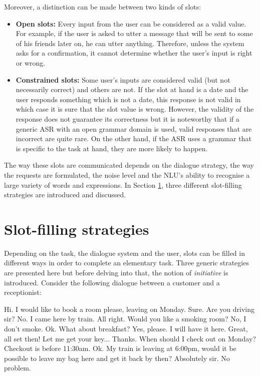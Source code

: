 	Moreover, a distinction can be made between two kinds of slots:
	
	\begin{itemize}
		\item \textbf{Open slots:} Every input from the user can be considered as a valid value. For example, if the user is asked to utter a message that will be sent to some of his friends later on, he can utter anything. Therefore, unless the system asks for a confirmation, it cannot determine whether the user's input is right or wrong.
		\item \textbf{Constrained slots:} Some user's inputs are considered valid (but not necessarily correct) and others are not. If the slot at hand is a date and the user responds something which is not a date, this response is not valid in which case it is sure that the slot value is wrong. However, the validity of the response does not guarantee its correctness but it is noteworthy that if a generic ASR with an open grammar domain is used, valid responses that are incorrect are quite rare. On the other hand, if the ASR uses a grammar that is specific to the task at hand, they are more likely to happen.
	\end{itemize}
	
	The way these slots are communicated depends on the dialogue strategy, the way the requests are formulated, the noise level and the NLU's ability to recognise a large variety of words and expressions. In Section \ref{sec:slotfillstrat}, three different slot-filling strategies are introduced and discussed.

\section{Slot-filling strategies}
\label{sec:slotfillstrat}

	Depending on the task, the dialogue system and the user, slots can be filled in different ways in order to complete an elementary task. Three generic strategies are presented here but before delving into that, the notion of \textit{initiative} is introduced. Consider the following dialogue between a customer and a receptionist:
	
	\begin{dialogue}
		 Hi. I would like to book a room please, leaving on Monday.
		 Sure. Are you driving sir?
		 No. I came here by train.
		 All right. Would you like a smoking room?
		 No, I don't smoke.
		 Ok. What about breakfast?
		 Yes, please. I will have it here.
		 Great, all set then! Let me get your key...
		 Thanks. When should I check out on Monday?
		 Checkout is before 11:30am.
		 Ok. My train is leaving at 6:00pm, would it be possible to leave my bag here and get it back by then?
		 Absolutely sir. No problem.
	\end{dialogue}

